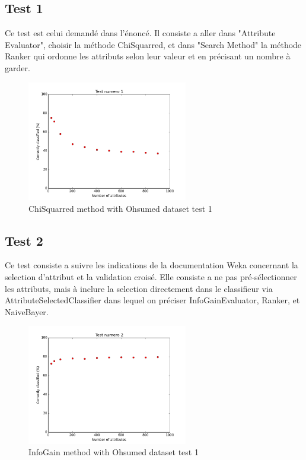 \documentclass[a4paper,10pt]{article}
\begin{document}
\subsection{Test 1}
Ce test est celui demandé dans l'énoncé. Il consiste a aller dans "Attribute Evaluator", choisir la méthode ChiSquarred, et dans "Search Method" la méthode Ranker qui ordonne les attributs selon leur valeur et en précisant un nombre à garder.
\begin{figure}[H]
	\includegraphics[width=7cm]{images/part2.png} 
	\centering
	\caption{ChiSquarred method with Ohsumed dataset test 1}
	\label{fig:comp}
\end{figure}

\subsection{Test 2}
Ce test consiste a suivre les indications de la documentation Weka concernant la selection d'attribut et la validation croisé. Elle consiste a ne pas pré-sélectionner les attributs, mais à inclure la selection directement dans le classifieur via AttributeSelectedClassifier dans lequel on préciser InfoGainEvaluator, Ranker, et NaiveBayer.

\begin{figure}[H]
	\includegraphics[width=7cm]{images/part2b.png} 
	\centering
	\caption{InfoGain method with Ohsumed dataset test 1}
	\label{fig:comp}
\end{figure}
\end{document}
